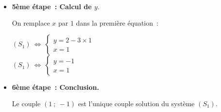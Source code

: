 {\begin{itemize}
          $(S_1)~\Leftrightarrow~\begin{cases} y=2-3x \\  x=1\end{cases}$\\
          \item %
          \textbf{5ème étape~: Calcul de $y.$}
          \par
          On  remplace $x$ par $1$ dans la première équation~:
          \par
          $(S_1)~\Leftrightarrow~\begin{cases} y=2-3\times 1\\  x=1\end{cases}$\\
          $(S_1)~\Leftrightarrow~\begin{cases} y=-1\\  x=1\end{cases}$\\
          \item %
          \textbf{6ème étape~: Conclusion. }
          \par
          Le couple $(1~;~-1)$ est l'unique couple solution du système $(S_1)$.
     \end{itemize}
} %
